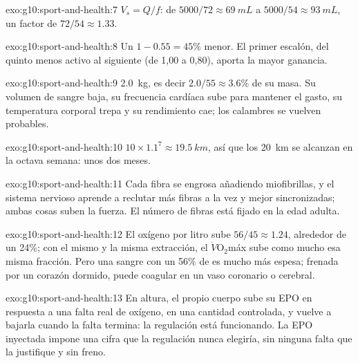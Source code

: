 \begin{solution}{exo:g10:sport-and-health:7}
$V_s = Q/f$: de $5000/72 \approx \qty{69}{mL}$ a $5000/54 \approx
\qty{93}{mL}$, un factor de $72/54 \approx 1.33$.
\end{solution}

\begin{solution}{exo:g10:sport-and-health:8}
Un $1 - 0.55 = 45\%$ menor. El primer escalón, del quinto menos activo
al siguiente (de 1,00 a 0,80), aporta la mayor ganancia.
\end{solution}

\begin{solution}{exo:g10:sport-and-health:9}
\qty{2.0}{kg}, es decir $2.0/55 \approx 3.6\%$ de su masa. Su volumen
de sangre baja, su frecuencia cardíaca sube para mantener el gasto, su
temperatura corporal trepa y su rendimiento cae; los calambres se
vuelven probables.
\end{solution}

\begin{solution}{exo:g10:sport-and-health:10}
$10 \times 1.1^7 \approx \qty{19.5}{km}$, así que los \qty{20}{km} se
alcanzan en la octava semana: unos dos meses.
\end{solution}

\begin{solution}{exo:g10:sport-and-health:11}
Cada fibra se engrosa añadiendo miofibrillas, y el sistema nervioso
aprende a reclutar más fibras a la vez y mejor sincronizadas; ambas
cosas suben la fuerza. El número de fibras está fijado en la edad
adulta.
\end{solution}

\begin{solution}{exo:g10:sport-and-health:12}
El oxígeno por litro sube $56/45 \approx 1.24$, alrededor de un 24\%;
con el mismo  y la misma extracción, el
$\dot V\!\mathrm{O_2}$máx sube como mucho esa misma fracción. Pero una
sangre con un 56\% de  es mucho más espesa; frenada por un
corazón dormido, puede coagular en un vaso coronario o cerebral.
\end{solution}

\begin{solution}{exo:g10:sport-and-health:13}
En altura, el propio cuerpo sube su EPO en respuesta a una falta real
de oxígeno, en una cantidad controlada, y vuelve a bajarla cuando la
falta termina: la regulación está funcionando. La EPO inyectada impone
una cifra que la regulación nunca elegiría, sin ninguna falta que la
justifique y sin freno.
\end{solution}

